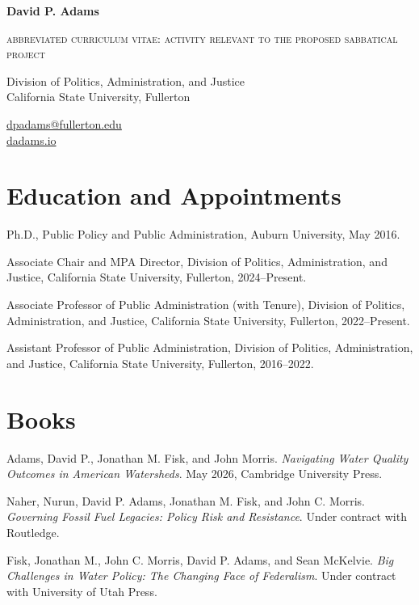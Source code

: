 \documentclass[10pt,letterpaper]{article}
\def\name{David P. Adams}
\renewenvironment{itemize}{
  \begin{list}{}{
    \setlength{\leftmargin}{1.5em}
    \setlength{\itemsep}{0.08em}
    \setlength{\parskip}{0pt}
    \setlength{\parsep}{0.08em}
  }
}{
  \end{list}
}
\begin{document}
\centerline{\LARGE \bf \name}
\smallskip
\centerline{\small{\textsc{abbreviated curriculum vitae: activity relevant to the proposed sabbatical project}}}

\medskip
\noindent
\begin{minipage}[t]{0.6\textwidth}
    Division of Politics, Administration, and Justice \\
    California State University, Fullerton
\end{minipage}
\hfill
\begin{minipage}[t]{0.38\textwidth}
    \raggedleft
    \href{mailto:dpadams@fullerton.edu}{dpadams@fullerton.edu} \\
    \href{https://dadams.io}{dadams.io}
\end{minipage}

\section*{Education and Appointments}
\begin{itemize}\leftmargin=2pt\itemindent=-15pt
  \item Ph.D., Public Policy and Public Administration, Auburn University, May 2016.
  \item Associate Chair and MPA Director, Division of Politics, Administration, and Justice, California State University, Fullerton, 2024--Present.
  \item Associate Professor of Public Administration (with Tenure), Division of Politics, Administration, and Justice, California State University, Fullerton, 2022--Present.
  \item Assistant Professor of Public Administration, Division of Politics, Administration, and Justice, California State University, Fullerton,  2016--2022.
\end{itemize}

\section*{Books}
\begin{itemize}\leftmargin=2pt\itemindent=-15pt
  \item Adams, David P., Jonathan M. Fisk, and John Morris. \emph{Navigating Water Quality Outcomes in American Watersheds}. May 2026, Cambridge University Press.
  \item Naher, Nurun, David P. Adams, Jonathan M. Fisk, and John C. Morris. \emph{Governing Fossil Fuel   Legacies: Policy Risk and Resistance}. Under contract with Routledge.
  \item Fisk, Jonathan M., John C. Morris, David P. Adams, and Sean McKelvie. \emph{Big Challenges in Water Policy: The Changing Face of Federalism}. Under contract with University of Utah Press.
\end{itemize}
\end{document}
